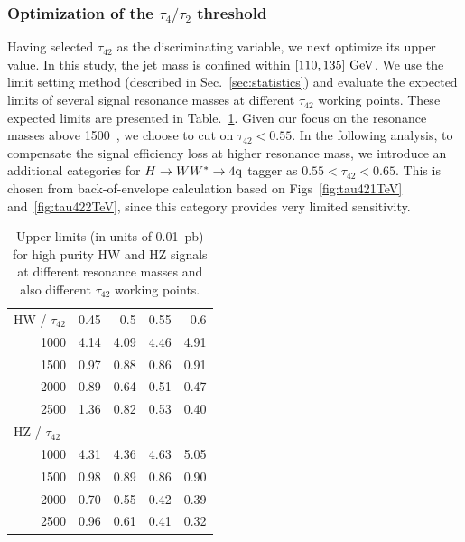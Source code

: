 \clearpage

\subsubsection{Optimization of the $\tau_4/\tau_2$ threshold}
\label{sec:tau42Opti}


Having selected $\tau_{42}$ as the discriminating variable, we next
optimize its upper value.  In this study, the jet mass is confined
within $[110, 135]~\mathrm{GeV}$.  We use the limit setting method (described
in Sec.~\ref{sec:statistics}) and evaluate the expected limits of
several signal resonance masses at different $\tau_{42}$ working
points.  These expected limits are presented
in Table.~\ref{table:tau42Opti}.
Given our focus on the resonance masses above 1500~\GeVcc, we
choose to cut on $\tau_{42} < 0.55$. In the following analysis, 
to compensate the signal efficiency loss at higher resonance mass, we 
introduce an additional categories for $H\to WW^*\to4{\rm q}$ tagger as $0.55 < \tau_{42} < 0.65$.
This is chosen from back-of-envelope calculation based on 
Figs~\ref{fig:tau421TeV} and~\ref{fig:tau422TeV}, since this category provides 
very limited sensitivity.  

\begin{table}[htbp]
\begin{center}
\caption{Upper limits (in units of 0.01~pb) 
for high purity HW and HZ signals at different resonance masses and also
different $\tau_{42}$ working points. }
\label{table:tau42Opti}
\begin{tabular}{|r|r|r|r|r|}
\hline
\multicolumn{1}{|l|}{HW / $\tau_{42}$} & 0.45 & 0.5 & 0.55 & 0.6 \\ 
1000 & 4.14 & 4.09 & 4.46 & 4.91 \\ 
1500 & 0.97 & 0.88 & 0.86 & 0.91 \\ 
2000 & 0.89 & 0.64 & 0.51 & 0.47 \\ 
2500 & 1.36 & 0.82 & 0.53 & 0.40 \\ \hline 
\multicolumn{1}{|l|}{HZ / $\tau_{42}$} & \multicolumn{1}{l|}{} & \multicolumn{1}{l|}{} & \multicolumn{1}{l|}{} & \multicolumn{1}{l|}{} \\ 
1000 & 4.31 & 4.36 & 4.63 & 5.05 \\ 
1500 & 0.98 & 0.89 & 0.86 & 0.90 \\ 
2000 & 0.70 & 0.55 & 0.42 & 0.39 \\ 
2500 & 0.96 & 0.61 & 0.41 & 0.32 \\ \hline
\end{tabular}
\end{center}
\end{table}



